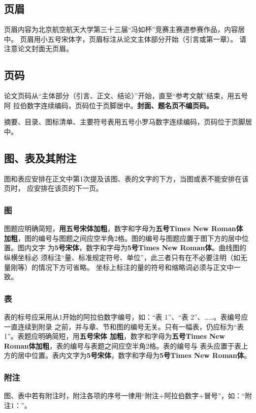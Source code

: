 \documentclass[zihao=-4]{ctexart}
\begin{document}
\begin{spacing}{1.5}
\subsection{页眉}
页眉内容为北京航空航天大学第三十三届“冯如杯”竞赛主赛道参赛作品，内容居中。
页眉用小五号宋体字，页眉标注从论文主体部分开始（引言或第一章）。
请注意论文封面无页眉。

\subsection{页码}
论文页码从“主体部分（引言、正文、结论）”开始，直至“参考文献”结束，用五号阿
拉伯数字连续编码，页码位于页脚居中。\textbf{封面、题名页不编页码。}

摘要、目录、图标清单、主要符号表用五号小罗马数字连续编码，页码位于页脚居中。

\subsection{图、表及其附注}
图和表应安排在正文中第1次提及该图、表的文字的下方，当图或表不能安排在该页时，
应安排在该页的下一页。

\subsubsection{图}
图题应明确简短，\textbf{用五号宋体加粗}，数字和字母为\textbf{五号Times New Roman体
加粗}，图的编号与图题之间应空半角2格。图的编号与图题应置于图下方的居中位置。图内文字
为\textbf{5号宋体}，数字和字母为\textbf{5号Times New Roman体}。曲线图的纵横坐标必
须标注“量、标准规定符号、单位”，此三者只有在不必要注明（如无量刚等）的情况下方可省略。
坐标上标注的量的符号和缩略词必须与正文中一致。

\subsubsection{表}
表的标号应采用从1开始的阿拉伯数字编号，如：“表 1”、“表 2”、……。表编号应一直连续到附录
之前，并与章、节和图的编号无关。只有一幅表，仍应标为“表 1”。表题应明确简短，用\textbf{五号宋体
加粗}，数字和字母为\textbf{五号Times New Roman体加粗}，表的编号与表题之间应空半角2格。表的编号与
表头应置于表上方的居中位置。表内文字为\textbf{5号宋体}，数字和字母为\textbf{5号Times New Roman体}。  

\subsubsection{附注}
图、表中若有附注时，附注各项的序号一律用“附注+阿拉伯数字+冒号”，如：“附注1：”。


\end{spacing}
\end{document}
